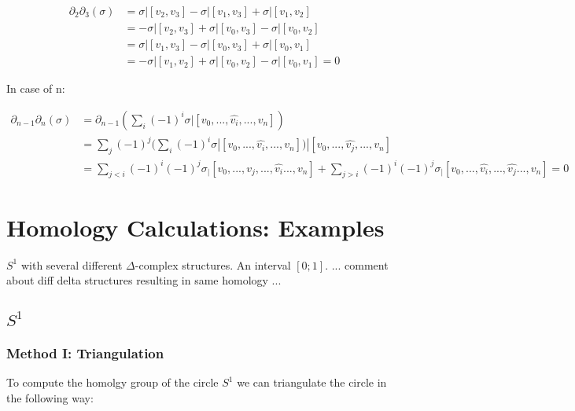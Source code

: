 \documentclass[11pt,a4paper]{report}
\begin{document}
          
            \begin{equation}
                \begin{aligned}
                    \partial_2 \partial_3(\sigma) &= \sigma | [v_2, v_3] - \sigma | [v_1, v_3] + \sigma | [v_1, v_2] \\
                    &= -\sigma | [v_2, v_3] + \sigma | [v_0, v_3] - \sigma | [v_0, v_2] \\
                    &= \sigma | [v_1, v_3] - \sigma | [v_0, v_3] + \sigma | [v_0, v_1] \\
                    &= -\sigma | [v_1, v_2] + \sigma | [v_0, v_2] - \sigma | [v_0, v_1] = 0 
                \end{aligned}
            \end{equation}
            
        In case of n:
        
            \begin{equation}
                \begin{aligned}
                    \partial_{n-1} \partial_n(\sigma) &=  \partial_{n-1}(\sum\limits_i (-1)^i \sigma | [v_0, ... ,\hat{v_i}, ... , v_n]) \\
                    &=  \sum\limits_j (-1)^j ( \sum\limits_i (-1)^i \sigma | [v_0, ... ,\hat{v_i}, ... , v_n]) | [v_0, ... ,\hat{v_j}, ... , v_n] \\
                    &=  \sum\limits_{j<i} (-1)^i(-1)^j  \sigma_ | [v_0, ... ,\hat{v_j},... ,\hat{v_i} ... , v_n] +
                    \sum\limits_{j>i} (-1)^i(-1)^{j}  \sigma_ | [v_0, ... ,\hat{v_i},... ,\hat{v_j} ... , v_n] = 0
                \end{aligned}
            \end{equation}
		 
		 \section{Homology Calculations: Examples}
		 
		 $S^1$ with several different $\Delta$-complex structures. An interval $[0;1]$.
         ... comment about diff delta structures resulting in same homology ...
		 
              \subsection{$ S^1$}
                \subsubsection{Method I: Triangulation}
                To compute the homolgy group of the circle $S^1$ we can triangulate the circle in the following way: \\
                
\end{document}
